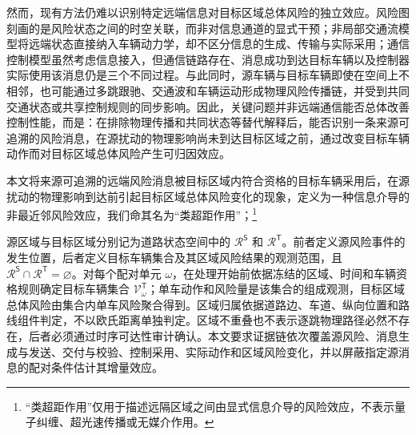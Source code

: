 \documentclass[10pt,a4paper,twocolumn]{article}
\newcommand{\revGreen}[1]{#1}
\newcommand{\revYellow}[1]{#1}
\begin{document}
\revYellow{然而，现有方法仍难以识别特定远端信息对目标区域总体风险的独立效应。风险图刻画的是风险状态之间的时空关联，而非对信息通道的显式干预；非局部交通流模型将远端状态直接纳入车辆动力学，却不区分信息的生成、传输与实际采用；通信控制模型虽然考虑信息接入，但通信链路存在、消息成功到达目标车辆以及控制器实际使用该消息仍是三个不同过程。与此同时，源车辆与目标车辆即使在空间上不相邻，也可能通过多跳跟驰、交通波和车辆运动形成物理风险传播链，并受到共同交通状态或共享控制规则的同步影响。因此，关键问题并非远端通信能否总体改善控制性能，而是：在排除物理传播和共同状态等替代解释后，能否识别一条来源可追溯的风险消息，在源扰动的物理影响尚未到达目标区域之前，通过改变目标车辆动作而对目标区域总体风险产生可归因效应。}

\revGreen{本文将来源可追溯的远端风险消息被目标区域内符合资格的目标车辆采用后，在源扰动的物理影响到达前引起目标区域总体风险变化的现象，定义为一种信息介导的非最近邻风险效应，我们命其名为“类超距作用”；}\footnote{\revGreen{“类超距作用”仅用于描述远隔区域之间由显式信息介导的风险效应，不表示量子纠缠、超光速传播或无媒介作用。}}

\revGreen{源区域与目标区域分别记为道路状态空间中的 $\mathcal R^{\mathsf S}$ 和 $\mathcal R^{\mathsf T}$。前者定义源风险事件的发生位置，后者定义目标车辆集合及其区域风险结果的观测范围，且 $\mathcal R^{\mathsf S}\cap\mathcal R^{\mathsf T}=\varnothing$。对每个配对单元 $\omega$，在处理开始前依据冻结的区域、时间和车辆资格规则确定目标车辆集合 $\mathcal V^{\mathsf T}_{\omega}$；单车动作和风险量是该集合的组成观测，目标区域总体风险由集合内单车风险聚合得到。区域归属依据道路边、车道、纵向位置和路线组件判定，不以欧氏距离单独判定。区域不重叠也不表示逐跳物理路径必然不存在，后者必须通过时序可达性审计确认。本文要求证据链依次覆盖源风险、消息生成与发送、交付与校验、控制采用、实际动作和区域风险变化，并以屏蔽指定源消息的配对条件估计其增量效应。}
\end{document}
